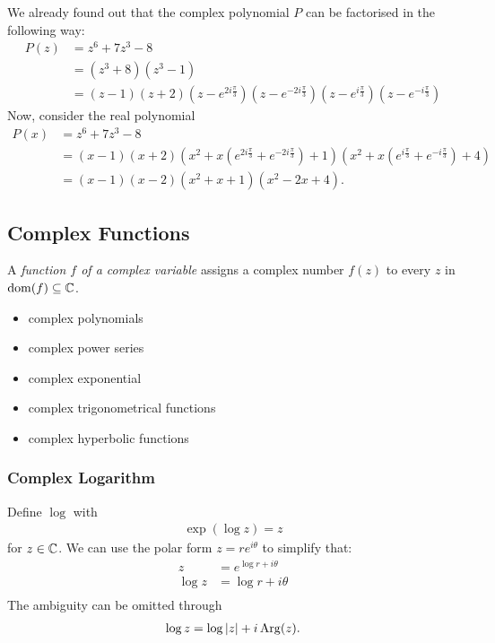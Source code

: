 \begin{ex}
	We already found out that the complex polynomial $P$ can be factorised in the following way:
	\begin{align*}
	P(z) &  = z^6 + 7z^3 - 8 \\
	& = (z^3+8)(z^3-1) \\
	& = (z-1)(z+2) \left(z - e^{2i \frac \pi 3} \right) \left(z - e^{-2i \frac \pi 3} \right) \left(z - e^{i \frac \pi 3} \right) \left(z - e^{-i \frac \pi 3} \right)
	\end{align*}
	Now, consider the real polynomial
	\begin{align*}
	P(x) & = z^6 + 7z^3 - 8 \\
	& = (x-1)(x+2) \left( x^2+ x\left( e^{2i \frac \pi 3} + e^{-2i \frac \pi 3} \right) +1 \right) \left( x^2 + x \left(e^{i \frac \pi 3} + e^{-i \frac \pi 3} \right) +4 \right) \\
	& = (x-1)(x-2)(x^2 +x+1) (x^2-2x+4)	.
	\end{align*}
\end{ex}

\subsection{Complex Functions}

\begin{df}
	A \emph{function $f$ of a complex variable} assigns a complex number $f(z)$ to every $z$ in $\operatorname{dom} (f) \subseteq \mathbb C$.
\end{df}

\begin{ex}
	\begin{itemize}
		\item
		complex polynomials
		\item
		complex power series
		\item
		complex exponential
		\item
		complex trigonometrical functions
		\item
		complex hyperbolic functions
	\end{itemize}
\end{ex}

\subsubsection{Complex Logarithm} 
\begin{df}
	Define $\log$ with
	\begin{align*}
	\exp(\log z) = z
	\end{align*}
	for $z \in \mathbb C$.
	We can use the polar form $z = r e^{i \theta}$ to simplify that:
	\begin{align*}
	z & = e^{\log r + i \theta} \\
	\log z & = \log r + i \theta \\
	\end{align*}
	The ambiguity can be omitted through
	\begin{align*}
	\log z = \log |z| + i \operatorname{Arg} (z).
	\end{align*}	
\end{df}

